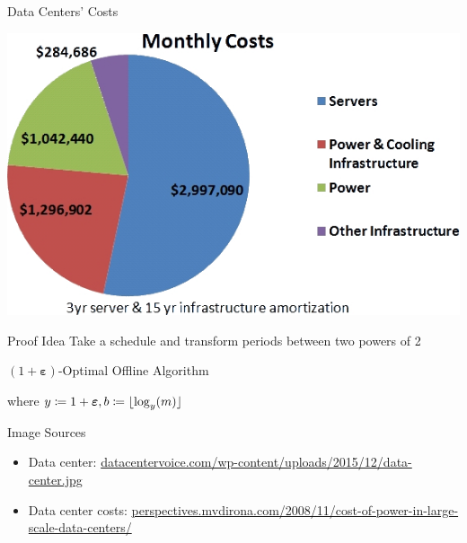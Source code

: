 \documentclass{beamer}
\DeclarePairedDelimiter\floor{\lfloor}{\rfloor}
\newcommand{\beps}{\boldsymbol\varepsilon}
\begin{document}
\begin{frame}{Data Centers' Costs}

\vspace{0.5\baselineskip}
\centering\includegraphics[height=0.5\textheight]{img/data_center_costs.jpg}
\end{frame}
\begin{frame}{Proof Idea}
\centering Take a schedule and transform periods between two powers of 2

\pause\begin{figure}
	
\end{figure}
\end{frame}
\begin{frame}{$(1+\beps)$-Optimal Offline Algorithm}
\begin{figure}
	
\end{figure}
\centering where $y\coloneqq1+\beps,b\coloneqq\floor{\log_y(m)}$
\end{frame}
\begin{frame}[allowframebreaks]{Image Sources}
\begin{itemize}
\item Data center: \url{datacentervoice.com/wp-content/uploads/2015/12/data-center.jpg}
\item Data center costs: \url{perspectives.mvdirona.com/2008/11/cost-of-power-in-large-scale-data-centers/}
\end{itemize}
\end{frame}
\end{document}
